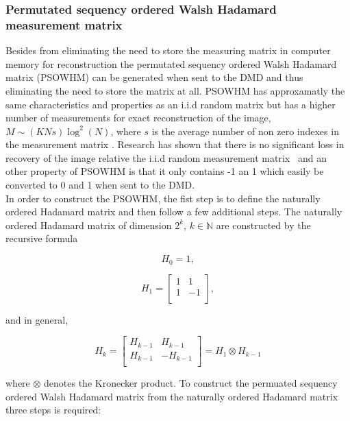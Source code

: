 \subsubsection{Permutated sequency ordered Walsh Hadamard measurement matrix}
\label{sec:SOWHMM}
Besides from eliminating the need to store the measuring matrix in computer memory for reconstruction the permutated sequency ordered Walsh Hadamard matrix (PSOWHM) can be generated when sent to the DMD and thus eliminating the need to store the matrix at all. PSOWHM has approxamatly the same characteristics and properties as an i.i.d random matrix but has a higher number of measurements for exact reconstruction of the image, $M \sim (KNs)\log^2(N)$, where $s$ is the average number of non zero indexes in the measurement matrix \cite{lec:fast_CS_SRM}. Research has shown that there is no significant loss in recovery of the image relative the i.i.d random measurement matrix~\cite{article:an_improved_WH_matrix} and an other property of PSOWHM is that it only contains -1 an 1 which easily be converted to 0 and 1 when sent to the DMD. \\[0.1in]


In order to construct the PSOWHM, the fist step is to define the naturally ordered Hadamard matrix and then follow a few additional steps. The naturally ordered Hadamard matrix of dimension $2^k$, $k \in \mathbb{N}$ are constructed by the recursive formula    

\begin{equation}
    H_0 = 1,
\end{equation}

\begin{equation}
    H_1 = \begin{bmatrix}
       1 & 1 \\
       1 & -1\\
     \end{bmatrix},
\end{equation}

and in general,

\begin{equation}
        H_k = \begin{bmatrix}
       H_{k-1} & H_{k-1} \\
       H_{k-1} & -H_{k-1}\\
       \end{bmatrix} = H_1 \otimes H_{k-1}
\end{equation}

where $\otimes$ denotes the Kronecker product. To construct the permuated sequency ordered Walsh Hadamard matrix from the naturally ordered Hadamard matrix three steps is required:

